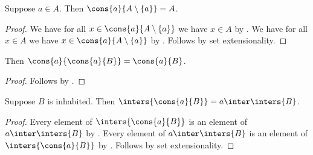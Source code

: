 \begin{proposition}\label{cons_remove}
    Suppose $a\in A$.
    Then $\cons{a}{A\setminus\{a\}} = A$.
\end{proposition}
\begin{proof}
    We have for all $x\in\cons{a}{A\setminus\{a\}}$ we have $x\in A$
        by .
    We have for all $x\in A$ we have $x\in\cons{a}{A\setminus\{a\}}$
        by .
    Follows by set extensionality.
\end{proof}

\begin{proposition}\label{cons_idempotent}
    Then $\cons{a}{\cons{a}{B}} = \cons{a}{B}$.
\end{proposition}
\begin{proof}
    Follows by .
\end{proof}

\begin{proposition}\label{inters_cons}
    Suppose $B$ is inhabited.
    Then $\inters{\cons{a}{B}} = a\inter\inters{B}$.
\end{proposition}
\begin{proof}
    Every element of $\inters{\cons{a}{B}}$ is an element of
    $a\inter\inters{B}$
        by .
    Every element of $a\inter\inters{B}$ is an element of
    $\inters{\cons{a}{B}}$
        by .
    Follows by set extensionality.
\end{proof}
